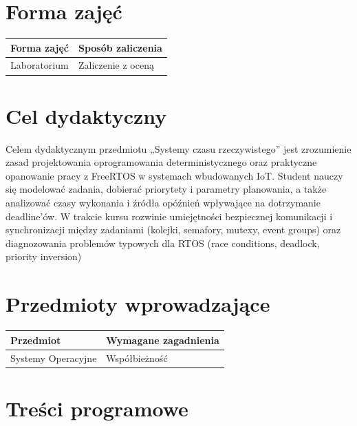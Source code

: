 \documentclass[12pt, a4paper]{article}
\begin{document}
\section{Forma zajęć}

\begin{tabular}{ll}
  \hline
  \textbf{Forma zajęć} & \textbf{Sposób zaliczenia} \\
  \hline
  Laboratorium & Zaliczenie z oceną \\
  \hline
\end{tabular}

\section{Cel dydaktyczny}

Celem dydaktycznym przedmiotu „Systemy czasu rzeczywistego” jest zrozumienie zasad projektowania oprogramowania deterministycznego oraz praktyczne opanowanie pracy z FreeRTOS w systemach wbudowanych IoT. Student nauczy się modelować zadania, dobierać priorytety i parametry planowania, a także analizować czasy wykonania i źródła opóźnień wpływające na dotrzymanie deadline’ów. W trakcie kursu rozwinie umiejętności bezpiecznej komunikacji i synchronizacji między zadaniami (kolejki, semafory, mutexy, event groups) oraz diagnozowania problemów typowych dla RTOS (race conditions, deadlock, priority inversion)

\section{Przedmioty wprowadzające}

\begin{tabularx}{\textwidth}{lX}
  \hline
  \textbf{Przedmiot} & \textbf{Wymagane zagadnienia} \\
  \hline
  Systemy Operacyjne & Współbieżność \\
  \hline
\end{tabularx}

\section{Treści programowe}
\end{document}
